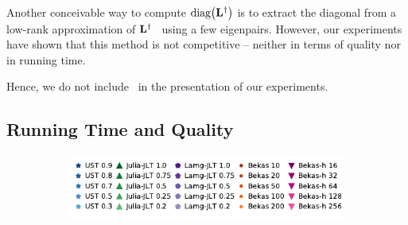 Another conceivable way to compute $\diag{\Linv}$ is to extract the diagonal from a low-rank
approximation of $\mathbf{L}^\dagger$~\cite{DBLP:journals/socnet/BozzoF13} using a few eigenpairs.
However, our experiments have shown that this method is not competitive -- neither in terms
of quality nor in running time.

Hence, we do not include~\cite{DBLP:journals/pc/Jacquelin0018,DBLP:journals/socnet/BozzoF13}
in the presentation of our experiments.


\subsection{Running Time and Quality}
\label{sec:el-clos:exp-time-quality}
\begin{figure}[tb]
\centering
\begin{subfigure}{\textwidth}
\centering
\includegraphics{sources/plots/el-clos/legend-quality.pdf}
\end{subfigure}\smallskip


\end{figure}
